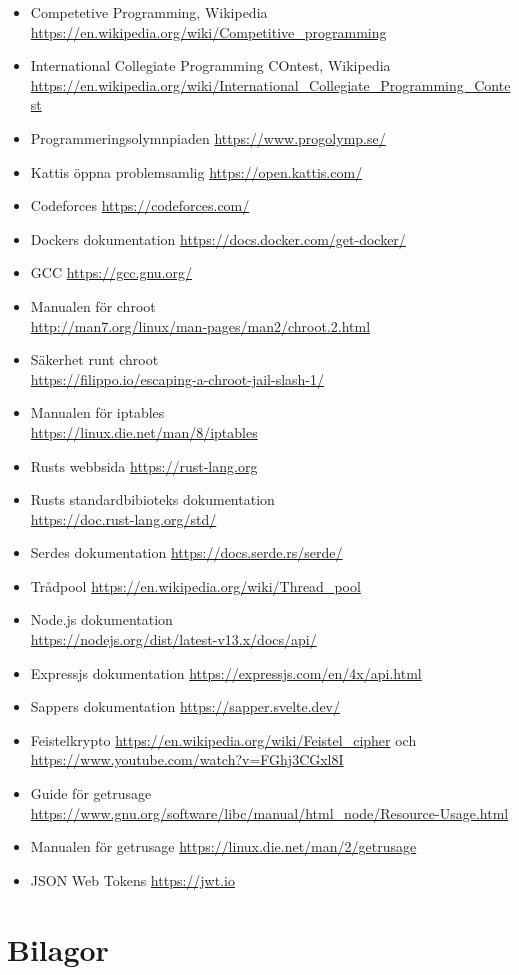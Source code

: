 \documentclass{article}
\begin{document}
\begin{itemize}
	\item Competetive Programming, Wikipedia \\
		\url{https://en.wikipedia.org/wiki/Competitive_programming}
	\item International Collegiate Programming COntest, Wikipedia \\
		\url{https://en.wikipedia.org/wiki/International_Collegiate_Programming_Contest}
	\item Programmeringsolymnpiaden \url{https://www.progolymp.se/}
	\item Kattis öppna problemsamlig \url{https://open.kattis.com/}
	\item Codeforces \url{https://codeforces.com/}
	\item Dockers dokumentation \url{https://docs.docker.com/get-docker/}
	\item GCC \url{https://gcc.gnu.org/}
	\item Manualen för chroot \\
		\url{http://man7.org/linux/man-pages/man2/chroot.2.html}
	\item Säkerhet runt chroot \\
		\url{https://filippo.io/escaping-a-chroot-jail-slash-1/}
	\item Manualen för iptables \\
		\url{https://linux.die.net/man/8/iptables}
	\item Rusts webbsida \url{https://rust-lang.org}
	\item Rusts standardbibioteks dokumentation \\
		\url{https://doc.rust-lang.org/std/}
	\item Serdes dokumentation \url{https://docs.serde.rs/serde/}
	\item Trådpool \url{https://en.wikipedia.org/wiki/Thread_pool}
	\item Node.js dokumentation \\
		\url{https://nodejs.org/dist/latest-v13.x/docs/api/}
	\item Expressjs dokumentation \url{https://expressjs.com/en/4x/api.html}
	\item Sappers dokumentation \url{https://sapper.svelte.dev/}
	\item Feistelkrypto \url{https://en.wikipedia.org/wiki/Feistel_cipher} och
		\\ \url{https://www.youtube.com/watch?v=FGhj3CGxl8I}
	\item Guide för getrusage
		\url{https://www.gnu.org/software/libc/manual/html_node/Resource-Usage.html}
	\item Manualen för getrusage
		\url {https://linux.die.net/man/2/getrusage}
	\item JSON Web Tokens \url{https://jwt.io}
\end{itemize}

\section{Bilagor}

\listoffigures{}

\listoflistings{}
\end{document}
